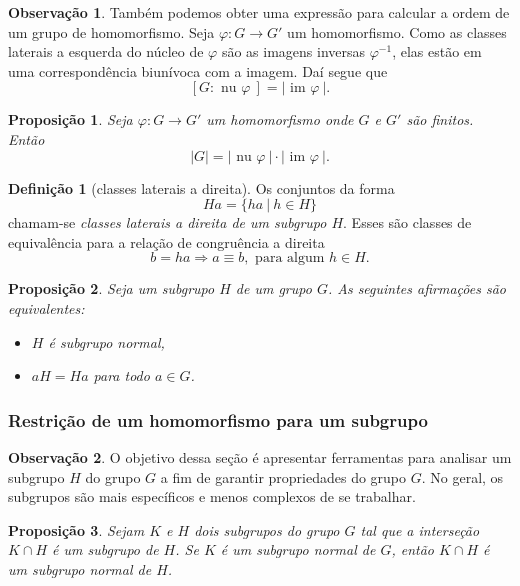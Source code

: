 \documentclass[a4paper,12pt]{report}
\theoremstyle{plain}
\newtheorem{proposicao}{Proposição}[section]
\theoremstyle{definition}
\newtheorem{definicao}{Definição}[section]
\newtheorem{observacao}{Observação}[section]
\begin{document}
	\begin{observacao}
		Também podemos obter uma expressão para calcular a ordem de um grupo de
		homomorfismo. Seja \(\varphi: G\longrightarrow G'\) um homomorfismo.
		Como as classes laterais a esquerda do núcleo de \(\varphi\) são as imagens
		inversas \(\varphi^{-1}\), elas estão em uma correspondência biunívoca
		com a imagem. Daí segue que
		\[[G:\text{ nu }\varphi\ ] = |\text{ im }\varphi\ |.\]
	\end{observacao}
	
	\begin{proposicao}
		Seja \(\varphi: G\longrightarrow G'\) um
		homomorfismo onde \(G\) e \(G'\) são finitos. Então
		\[|G| = |\text{ nu }\varphi\ |\cdot|\text{ im }\varphi\ |.\]	
	\end{proposicao}
	
	\begin{definicao}[classes laterais a direita]
		Os conjuntos da forma
		\[Ha = \{ha \ | \ h \in H\}\] chamam-se \emph{classes laterais a direita de um
			subgrupo \(H\)}. Esses são classes de equivalência para a relação de
		congruência a direita
		\[b = ha \Rightarrow a \equiv b, \text{ para algum }h \in H.\]	
	\end{definicao}
	
	\begin{proposicao}
		Seja um subgrupo \(H\) de um grupo \(G\). As
		seguintes afirmações são equivalentes:
		
		\begin{itemize}
			\item
			\(H\) é subgrupo normal,
			\item
			\(aH = Ha\) para todo \(a\in G\).
		\end{itemize}	
	\end{proposicao}
	
	\subsubsection{Restrição de um homomorfismo para um subgrupo}
	
	\begin{observacao}
		O objetivo dessa seção é apresentar ferramentas para analisar um subgrupo \(H\)
		do grupo \(G\) a fim de garantir propriedades do grupo \(G\). No geral,
		os subgrupos são mais específicos e menos complexos de se trabalhar.
	\end{observacao}
	
	\begin{proposicao}
		Sejam \(K\) e \(H\) dois subgrupos do grupo \(G\)
		tal que a interseção \(K\cap H\) é um subgrupo de \(H\). Se \(K\) é um
		subgrupo normal de \(G\), então \(K\cap H\) é um subgrupo normal de
		\(H\).	
	\end{proposicao}
	
\end{document}
